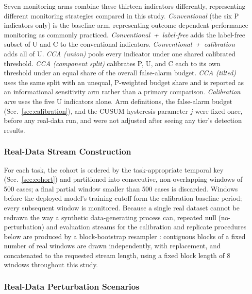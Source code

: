 \documentclass[apajournal,article,submit,oneauthor]{Definitions/mdpi}
\begin{document}
Seven monitoring arms combine these thirteen indicators differently, representing different monitoring strategies compared in this study. \emph{Conventional} (the six P indicators only) is the baseline arm, representing outcome-dependent performance monitoring as commonly practiced. \emph{Conventional~+~label-free} adds the label-free subset of U and C to the conventional indicators. \emph{Conventional~+~calibration} adds all of U. \emph{CCA (union)} pools every indicator under one shared calibrated threshold. \emph{CCA (component split)} calibrates P, U, and C each to its own threshold under an equal share of the overall false-alarm budget. \emph{CCA (tilted)} uses the same split with an unequal, P-weighted budget share and is reported as an informational sensitivity arm rather than a primary comparison. \emph{Calibration arm} uses the five U indicators alone. Arm definitions, the false-alarm budget (Sec.~\ref{sec:calibration}), and the CUSUM hysteresis parameter $j$ were fixed once, before any real-data run, and were not adjusted after seeing any tier's detection results.

\subsubsection{Real-Data Stream Construction}\label{sec:windowing}

For each task, the cohort is ordered by the task-appropriate temporal key (Sec.~\ref{sec:cohort}) and partitioned into consecutive, non-overlapping windows of 500 cases; a final partial window smaller than 500 cases is discarded. Windows before the deployed model's training cutoff form the calibration baseline period; every subsequent window is monitored. Because a single real dataset cannot be redrawn the way a synthetic data-generating process can, repeated null (no-perturbation) and evaluation streams for the calibration and replicate procedures below are produced by a block-bootstrap resampler \citep{kunsch1989}: contiguous blocks of a fixed number of real windows are drawn independently, with replacement, and concatenated to the requested stream length, using a fixed block length of 8 windows throughout this study.

\subsubsection{Real-Data Perturbation Scenarios}\label{sec:scenarios}
\end{document}
